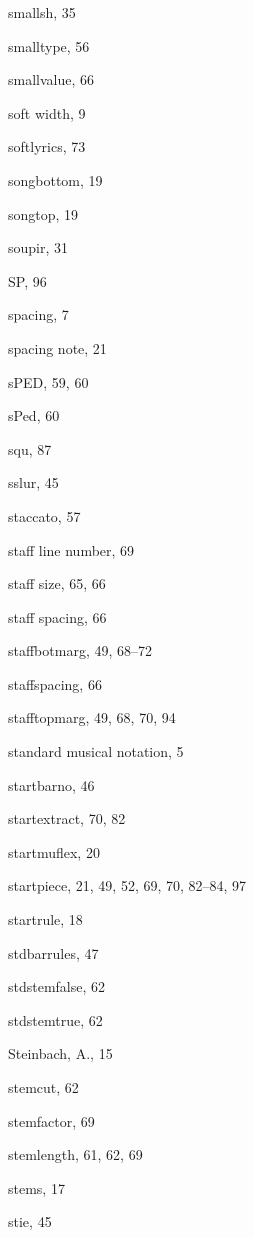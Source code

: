\begin{theindex}
  \item {\Bslash smallsh}, 35
  \item {\Bslash smalltype}, 56
  \item {\Bslash smallvalue}, 66
  \item soft width, 9
  \item {\Bslash softlyrics}, 73
  \item {\Bslash songbottom}, 19
  \item {\Bslash songtop}, 19
  \item {\Bslash soupir}, 31
  \item {\Bslash SP}, 96
  \item spacing, 7
  \item spacing note, 21
  \item {\Bslash sPED}, 59, 60
  \item {\Bslash sPed}, 60
  \item {\Bslash squ}, 87
  \item {\Bslash sslur}, 45
  \item staccato, 57
  \item staff line number, 69
  \item staff size, 65, 66
  \item staff spacing, 66
  \item {\Bslash staffbotmarg}, 49, 68--72
  \item {\Bslash staffspacing}, 66
  \item {\Bslash stafftopmarg}, 49, 68, 70, 94
  \item standard musical notation, 5
  \item {\Bslash startbarno}, 46
  \item {\Bslash startextract}, 70, 82
  \item {\Bslash startmuflex}, 20
  \item {\Bslash startpiece}, 21, 49, 52, 69, 70, 82--84, 97
  \item {\Bslash startrule}, 18
  \item {\Bslash stdbarrules}, 47
  \item {\Bslash stdstemfalse}, 62
  \item {\Bslash stdstemtrue}, 62
  \item {\sc Steinbach, A.}, 15
  \item {\Bslash stemcut}, 62
  \item {\Bslash stemfactor}, 69
  \item {\Bslash stemlength}, 61, 62, 69
  \item stems, 17
  \item {\Bslash stie}, 45

\end{theindex}
